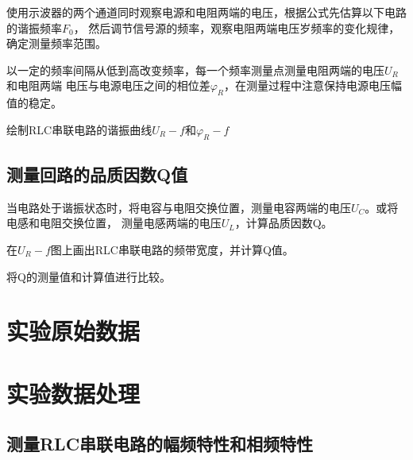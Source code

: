 \documentclass{ctexart}
\begin{document}
   使用示波器的两个通道同时观察电源和电阻两端的电压，根据公式先估算以下电路的谐振频率$F_{0}$，
              然后调节信号源的频率，观察电阻两端电压岁频率的变化规律，确定测量频率范围。

   以一定的频率间隔从低到高改变频率，每一个频率测量点测量电阻两端的电压$U_{R}$和电阻两端
              电压与电源电压之间的相位差$\varphi_{R}$，在测量过程中注意保持电源电压幅值的稳定。

   绘制RLC串联电路的谐振曲线$U_{R}-f\mbox{和}\varphi_{R}-f$

  \subsection{测量回路的品质因数Q值}
   当电路处于谐振状态时，将电容与电阻交换位置，测量电容两端的电压$U_{C}$。或将电感和电阻交换位置，
              测量电感两端的电压$U_{L}$，计算品质因数Q。

   在$U_{R}-f$图上画出RLC串联电路的频带宽度，并计算Q值。

   将Q的测量值和计算值进行比较。
\newpage

\section{实验原始数据}
\newpage

\section{实验数据处理}
  \subsection{测量RLC串联电路的幅频特性和相频特性}
\end{document}
